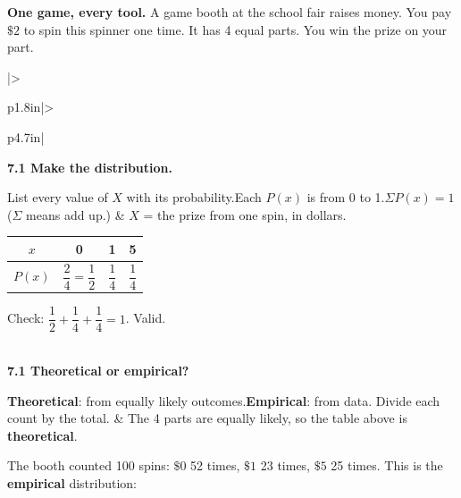 \documentclass[11pt]{article}
\begin{document}

\begin{minipage}[c]{0.7\linewidth}\raggedright
\textbf{One game, every tool.} A game booth at the school fair raises money. You pay $\$2$ to spin this spinner one time. It has 4 equal parts. You win the prize on your part.
\end{minipage}\hfill
\begin{minipage}[c]{0.26\linewidth}\centering
{}
\end{minipage}

\vspace{0.6em}
\renewcommand{\arraystretch}{1.4}
\begin{tabular}{|>{\raggedright\arraybackslash}p{1.8in}|>{\raggedright\arraybackslash}p{4.7in}|}
\hline
\textbf{7.1 Make the distribution.}

List every value of $X$ with its probability.\newline Each $P(x)$ is from 0 to 1.\newline $\Sigma P(x) = 1$ \newline ($\Sigma$ means add up.) &
$X$ = the prize from one spin, in dollars.

\begin{minipage}[c]{0.46\linewidth}
\renewcommand{\arraystretch}{2.2}
\begin{tabular}{|c|c|c|c|}\hline
$x$ & 0 & 1 & 5\\ \hline
$P(x)$ & $\dfrac{2}{4} = \dfrac{1}{2}$ & $\dfrac{1}{4}$ & $\dfrac{1}{4}$\\ \hline
\end{tabular}

\vspace{0.5em}
Check: $\dfrac{1}{2} + \dfrac{1}{4} + \dfrac{1}{4} = 1$. \; Valid.
\end{minipage}\hfill
\begin{minipage}[c]{0.52\linewidth}\centering
\vspace{0.3em}
\end{minipage} \\ \hline
\textbf{7.1 Theoretical or empirical?}

\textbf{Theoretical}: from equally likely outcomes.\newline \textbf{Empirical}: from data. Divide each count by the total. &
The 4 parts are equally likely, so the table above is \textbf{theoretical}.

The booth counted 100 spins: $\$0$ 52 times, $\$1$ 23 times, $\$5$ 25 times. This is the \textbf{empirical} distribution:


\end{tabular}
\end{document}
